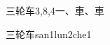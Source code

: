 \begin{entry}{三轮车}{3,8,4}{⼀、⾞、⾞}
  \begin{phonetics}{三轮车}{san1lun2che1}
  \end{phonetics}
\end{entry}
